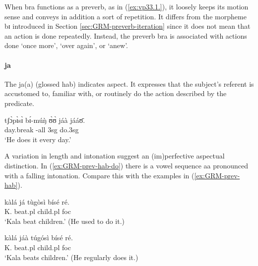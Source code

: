 \begin{exe}
\begin{exe}
\begin{exe}
\begin{exe}
\begin{exe}
\begin{exe}
\begin{exe}
\begin{exe}
\begin{exe}
\begin{exe}
\begin{exe}
\begin{exe}
When {\sls bra} functions as a preverb, as in (\ref{ex:vp33.1.}),  it loosely keeps its motion sense and conveys in addition a sort of repetition. It differs from the morpheme {\sls bɪ} introduced in Section \ref{sec:GRM-preverb-iteration} since it does not mean that an action is done repeatedly.  Instead, the preverb {\sls bra} is associated with actions done `once more', `over again',  or `anew'.

\paragraph{ja}
\label{sec:GRM-preverb-hab}

The  {\sls ja(a)} (glossed {\sc hab})  indicates  aspect. It 
expresses that the subject's referent is accustomed to, familiar with, or 
routinely do the action described by the predicate.


\ea\label{ex:GRM-prev-hab-do}
\gll tʃɔ̀pɪ̀sɪ̀ bɪ́-múŋ̀ ʊ̀ʊ̀ jáà jááʊ̄.\\
 day.break {\itr}-all {\sc 3sg} {\hab} do.{\sc 3sg}\\
\glt `He does it every day.'
\z 

 A variation in  length and intonation suggest  an (im)perfective aspectual 
distinction. In   (\ref{ex:GRM-prev-hab-do})  there is a  vowel sequence {\sls 
aa} pronounced with a falling intonation. Compare this with the examples in 
(\ref{ex:GRM-prev-hab}). 



 

\ea\label{ex:GRM-prev-hab}
\ea\label{ex:GRM-prev-hab-do-pfv}
\gll  kàlá já tùgòsì bísé ré.\\
 K.  {\hab}  beat.{\sc pl} child.{\sc pl} {\sc foc}\\
\glt `Kala beat children.' (He used to do it.)

\ex\label{ex:GRM-prev-hab-impv}
\gll  kàlá jáà túgósì bísé ré.\\
K.  {\hab}  beat.{\sc pl} child.{\sc pl} {\sc foc}\\
\glt `Kala beats children.' (He regularly does it.)


\end{exe}
\end{exe}
\end{exe}
\end{exe}
\end{exe}
\end{exe}
\end{exe}
\end{exe}
\end{exe}
\end{exe}
\end{exe}
\end{exe}

